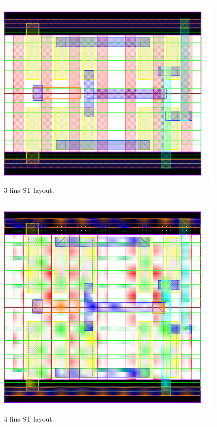 \documentclass[pgmicro,mestrado,english]{iiufrgs}
\begin{document}
\begin{figure}[]
\centering
\includegraphics[width=\textwidth,height=\textheight,keepaspectratio]{ST3F.png}
\caption{3 fins ST layout.}
\label{fig:ST3F}
\end{figure}

\begin{figure}[]
\centering
\includegraphics[width=\textwidth,height=\textheight,keepaspectratio]{ST4F.png}
\caption{4 fins ST layout.}
\label{fig:ST4F}
\end{figure}
\end{document}
